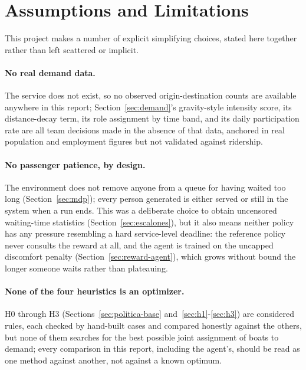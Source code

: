 \documentclass[11pt,a4paper]{article}
\begin{document}
\section{Assumptions and Limitations}
\label{sec:limitaciones}

This project makes a number of explicit simplifying choices, stated here together rather than left scattered or implicit.

\paragraph{No real demand data.} The service does not exist, so no observed origin-destination counts are available anywhere in this report; Section~\ref{sec:demand}'s gravity-style intensity score, its distance-decay term, its role assignment by time band, and its daily participation rate are all team decisions made in the absence of that data, anchored in real population and employment figures but not validated against ridership.

\paragraph{No passenger patience, by design.} The environment does not remove anyone from a queue for having waited too long (Section~\ref{sec:mdp}); every person generated is either served or still in the system when a run ends. This was a deliberate choice to obtain uncensored waiting-time statistics (Section~\ref{sec:escalones}), but it also means neither policy has any pressure resembling a hard service-level deadline: the reference policy never consults the reward at all, and the agent is trained on the uncapped discomfort penalty (Section~\ref{sec:reward-agent}), which grows without bound the longer someone waits rather than plateauing.

\paragraph{None of the four heuristics is an optimizer.} H0 through H3 (Sections~\ref{sec:politica-base} and~\ref{sec:h1}-\ref{sec:h3}) are considered rules, each checked by hand-built cases and compared honestly against the others, but none of them searches for the best possible joint assignment of boats to demand; every comparison in this report, including the agent's, should be read as one method against another, not against a known optimum.
\end{document}
